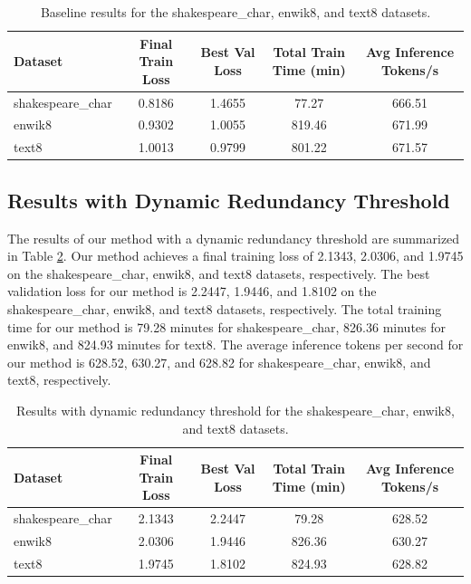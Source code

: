 \documentclass{article} %
\begin{document}
\begin{table}[h]
    \centering
    \begin{tabular}{lcccc}
        \toprule
        Dataset & Final Train Loss & Best Val Loss & Total Train Time (min) & Avg Inference Tokens/s \\
        \midrule
        shakespeare\_char & 0.8186 & 1.4655 & 77.27 & 666.51 \\
        enwik8 & 0.9302 & 1.0055 & 819.46 & 671.99 \\
        text8 & 1.0013 & 0.9799 & 801.22 & 671.57 \\
        \bottomrule
    \end{tabular}
    \caption{Baseline results for the shakespeare\_char, enwik8, and text8 datasets.}
    \label{tab:baseline_results}
\end{table}

\subsection{Results with Dynamic Redundancy Threshold}

The results of our method with a dynamic redundancy threshold are summarized in Table \ref{tab:dynamic_threshold_results}. Our method achieves a final training loss of 2.1343, 2.0306, and 1.9745 on the shakespeare\_char, enwik8, and text8 datasets, respectively. The best validation loss for our method is 2.2447, 1.9446, and 1.8102 on the shakespeare\_char, enwik8, and text8 datasets, respectively. The total training time for our method is 79.28 minutes for shakespeare\_char, 826.36 minutes for enwik8, and 824.93 minutes for text8. The average inference tokens per second for our method is 628.52, 630.27, and 628.82 for shakespeare\_char, enwik8, and text8, respectively.

\begin{table}[h]
    \centering
    \begin{tabular}{lcccc}
        \toprule
        Dataset & Final Train Loss & Best Val Loss & Total Train Time (min) & Avg Inference Tokens/s \\
        \midrule
        shakespeare\_char & 2.1343 & 2.2447 & 79.28 & 628.52 \\
        enwik8 & 2.0306 & 1.9446 & 826.36 & 630.27 \\
        text8 & 1.9745 & 1.8102 & 824.93 & 628.82 \\
        \bottomrule
    \end{tabular}
    \caption{Results with dynamic redundancy threshold for the shakespeare\_char, enwik8, and text8 datasets.}
    \label{tab:dynamic_threshold_results}
\end{table}
\end{document}
